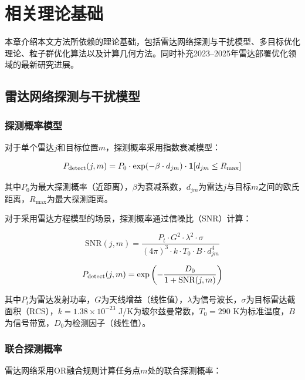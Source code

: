 \section{相关理论基础}
\label{sec:related}

本章介绍本文方法所依赖的理论基础，包括雷达网络探测与干扰模型、多目标优化理论、粒子群优化算法以及计算几何方法。同时补充2023--2025年雷达部署优化领域的最新研究进展。

\subsection{雷达网络探测与干扰模型}

\subsubsection{探测概率模型}

对于单个雷达$j$和目标位置$m$，探测概率采用指数衰减模型：

\begin{equation}
P_{\text{detect}}(j, m) = P_0 \cdot \exp(-\beta \cdot d_{jm}) \cdot \mathbf{1}[d_{jm} \leq R_{\max}]
\label{eq:detection_prob}
\end{equation}

其中$P_0$为最大探测概率（近距离），$\beta$为衰减系数，$d_{jm}$为雷达$j$与目标$m$之间的欧氏距离，$R_{\max}$为最大探测距离。

对于采用雷达方程模型的场景，探测概率通过信噪比（SNR）计算：

\begin{equation}
\text{SNR}(j, m) = \frac{P_t \cdot G^2 \cdot \lambda^2 \cdot \sigma}{(4\pi)^3 \cdot k \cdot T_0 \cdot B \cdot d_{jm}^4}
\label{eq:snr}
\end{equation}

\begin{equation}
P_{\text{detect}}(j, m) = \exp\left(-\frac{D_0}{1 + \text{SNR}(j, m)}\right)
\label{eq:detection_prob_radar}
\end{equation}

其中$P_t$为雷达发射功率，$G$为天线增益（线性值），$\lambda$为信号波长，$\sigma$为目标雷达截面积（RCS），$k=1.38\times10^{-23}$ J/K为玻尔兹曼常数，$T_0=290$ K为标准温度，$B$为信号带宽，$D_0$为检测因子（线性值）。

\subsubsection{联合探测概率}

雷达网络采用OR融合规则计算任务点$m$处的联合探测概率：

